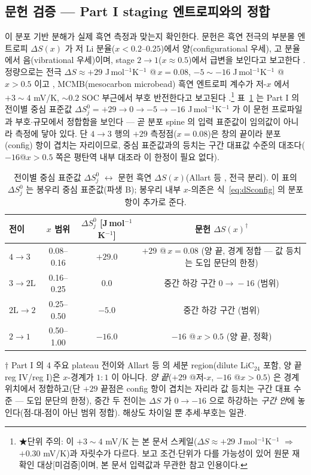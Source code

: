 \subsection{문헌 검증 --- Part I staging 엔트로피와의 정합}\label{ssec:litverif}
이 분포 기반 분해가 실제 흑연 측정과 맞는지 확인한다. 문헌은 흑연 전극의 부분몰 엔트로피 $\Delta S(x)$ 가
저 Li 분율($x<0.2$--$0.25$)에서 양(configurational 우세), 고 분율에서 음(vibrational 우세)이며, stage
$2\to1$($x\approx0.5$)에서 급변을 보인다고 보고한다 \cite{reynier2003,allart2018}. 정량으로는 전극
$\Delta S\approx+29$ J\,mol$^{-1}$K$^{-1}$ @\,$x=0.08$, $-5\sim-16$ J\,mol$^{-1}$K$^{-1}$ @\,$x>0.5$ 이고
\cite{allart2018}, MCMB(mesocarbon microbead) 흑연 엔트로피 계수가 저-$x$ 에서 $+3\sim4$ mV/K,
$\sim0.2$ SOC 부근에서 부호 반전한다고 보고된다 \cite{msmr_partII}.\footnote{★단위 주의: 이 $+3\sim4$ mV/K 는
본 문서 스케일($\Delta S\approx+29$ J\,mol$^{-1}$K$^{-1}$ $\Rightarrow$ $+0.30$ mV/K)과 자릿수가 다르다. 보고
조건$\cdot$단위가 다를 가능성이 있어 원문 재확인 대상[미검증]이며, 본 문서 입력값과 무관한 참고 인용이다.}
표~\ref{tab:ds} 는 Part I 의 전이별 중심 표준값 $\Delta S^0_j=+29\to0\to-5\to-16$ J\,mol$^{-1}$K$^{-1}$ 가
이 문헌 프로파일과 부호$\cdot$규모에서 정합함을 보인다 --- 곧 분포 spine 의 입력 표준값이 임의값이 아니라
측정에 닿아 있다. 단 $4\!\to\!3$ 행의 $+29$ 측정점($x{=}0.08$)은 창의 끝이라 분포(config) 항이 겹치는
자리이므로, 중심 표준값과의 등치는 구간 대표값 수준의 대조다($-16$@$x>0.5$ 쪽은 평탄역 내부 대조라 이 한정이
필요 없다).

\begin{table}[t]
\centering\small
\renewcommand{\arraystretch}{1.2}
\caption{전이별 중심 표준값 $\Delta S^0_j$ $\leftrightarrow$ 문헌 흑연 $\Delta S(x)$(Allart 등
\cite{allart2018}, 전극 분리). 이 표의 $\Delta S^0_j$ 는 봉우리 중심 표준값(파생 B); 봉우리 내부 $x$-의존은
식~\eqref{eq:dSconfig} 의 분포 항이 추가로 준다.}
\label{tab:ds}
\begin{tabular}{l c c c}
\toprule
전이 & $x$ 범위 & $\Delta S^0_j$ [J\,mol$^{-1}$K$^{-1}$] & 문헌 $\Delta S(x)^\dagger$ \\
\midrule
$4\!\to\!3$ & 0.08–0.16 & $+29.0$ & $+29$ @\,$x{=}0.08$ (양 끝, 경계 정합 --- 값 등치는 도입 문단의 한정) \\
$3\!\to\!2\mathrm L$ & 0.16–0.25 & $0.0$ & 중간 하강 구간 $0\!\to\!-16$ (범위) \\
$2\mathrm L\!\to\!2$ & 0.25–0.50 & $-5.0$ & 중간 하강 구간 (범위) \\
$2\!\to\!1$ & 0.50–1.00 & $-16.0$ & $-16$ @\,$x{>}0.5$ (양 끝, 정확) \\
\bottomrule
\end{tabular}

\smallskip
{\footnotesize $\dagger$ Part I 의 4 주요 plateau 전이와 Allart 등 \cite{allart2018} 의 세분 region(dilute
LiC$_{24}$ 포함, 양 끝 reg IV/reg I)은 $x$-경계가 $1{:}1$ 이 아니다. \emph{양 끝}($+29$ @저-$x$, $-16$ @$x{>}0.5$)
은 경계 위치에서 정합하고(단 $+29$ 끝점은 config 항이 겹치는 자리라 값 등치는 구간 대표 수준 --- 도입
문단의 한정), 중간 두 전이는 $\Delta S$ 가 $0\to-16$ 으로 하강하는 \emph{구간 안}에 놓인다(점-대-점이 아닌
범위 정합). 해상도 차이일 뿐 추세$\cdot$부호는 일관.}
\end{table}

